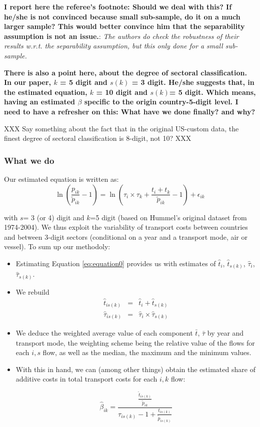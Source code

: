 \documentclass[a4paper,12pt]{article}
\begin{document}
\textbf{I report here the referee's footnote: Should we deal with this? If he/she is not convinced because small sub-sample, do it on a much larger sample? This would better convince him that the separability assumption is not an issue.}: \textit{The authors do check the robustness of their results w.r.t. the separability assumption, but this only done for a small sub-sample.}



\textbf{There is also a point here, about the degree of sectoral classification. In our paper, $k$ = 5 digit and $s(k)$ = 3 digit. He/she suggests that, in the estimated equation, $k$ = 10 digit and $s(k)$= 5 digit. Which means, having an estimated $\beta$ specific to the origin country-5-digit level. I need to have a refresher on this: What have we done finally? and why?}


XXX Say something about the fact that in the original US-custom data, the finest degree of sectoral classification is 8-digit, not 10? XXX

\subsubsection{What we do}

Our estimated equation is written as:
\begin{equation}
\ln\left(\frac{p_{ik}}{\widetilde{p}_{ik}}-1 \right)= \ln \left(\tau_{i} \times \tau_{k}+\frac{t_{i} + t_{k}}{\widetilde{p}_{ik}}-1 \right) + \epsilon_{ik} \label{eq:equation0}
\end{equation}

\noindent with $s$= 3 (or 4) digit and $k$=5 digit (based on Hummel's original dataset from 1974-2004). We thus exploit the variability of transport costs between countries and between 3-digit sectors (conditional on a year and a transport mode, air or vessel). To sum up our methodoly:
\begin{itemize}
\item Estimating Equation \ref{eq:equation0} provides us with estimates of $\hat{t}_i$, $\hat{t}_{s(k)}$, $\hat{\tau}_i$, $\hat{\tau}_{s(k)}$.
\item We rebuild
\begin{eqnarray*}
\hat{t}_{is(k)} &= &\hat{t}_{i}+\hat{t}_{s(k)} \\
\hat{\tau}_{is(k)} &= & \hat{\tau}_{i}\times\hat{\tau}_{s(k)}
\end{eqnarray*}
\item We deduce the weighted average value of each component $\bar{t}$, $\bar{\tau}$ by year and transport mode, the weighting scheme being the relative value of the flows for each $i,s$ flow, as well as the median, the maximum and the minimum values.
\item With this in hand, we can (among other things) obtain the estimated share of additive costs in total transport costs for each $i,k$ flow:


$$\hat{\beta}_{ik} = \frac{\frac{\hat{t}_{is(k)}}{\tilde{p}_{ik}}}{\tau_{is(k)}-1 + \frac{t_{is(k)}}{\tilde{p}_{is(k)}}} $$
\end{itemize}
\end{document}
